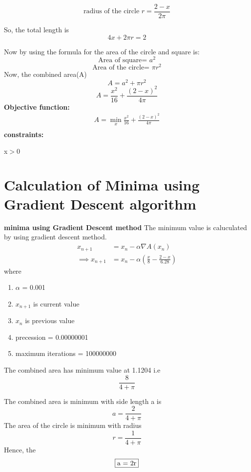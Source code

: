 \documentclass[10pt, a4paper]{article}
\providecommand{\brak}[1]{\ensuremath{\left(#1\right)}}
\begin{document}
\begin{equation}
\text{radius  of the circle }
r=\frac{2-x}{2\pi}
\label{eq-2}
\end{equation}


So, the total length is 
\begin{equation}
4x + 2\pi r = 2
\end{equation} 

Now by using the formula for the area of the circle and square is:
\begin{equation}
\text{Area of square= }a^2
\end{equation}
\begin{equation}
\text{Area of the circle= }\pi r^2
\end{equation}
Now, the combined area(A) 
\begin{equation}
A=a^2+\pi r^2
\end{equation}
\begin{equation}
A = \frac{x^2}{16} + \frac{(2-x)^2}{4\pi}
\end{equation}
\textbf{Objective function:}
\begin{align}
A= \min_x\frac{x^2}{16} + \frac{(2-x)^2}{4\pi}\\
\end{align}
\textbf{constraints:}\\
\begin{center}
x$>$0\\
\end{center}



\section{Calculation of Minima using Gradient Descent algorithm}
\textbf{minima using  Gradient Descent  method}
The minimum value is caluculated by using gradient descent method.
\begin{align}
        x_{n+1} &= x_n - \alpha \nabla A(x_n) \\
        \implies x_{n+1} &= x_n - \alpha\brak{\frac{x}{8}-\frac{2-x}{6.28}}
\end{align}
where \\
\begin{enumerate}
\item $\alpha$ = 0.001
\item $x_{n+1}$ is current value
\item $x_{n}$ is previous value
\item precession = 0.00000001
\item maximum iterations = 100000000
\end{enumerate}
The combined area has minimum value at 1.1204 i.e
\begin{equation}
\frac{8}{4+\pi}
\end{equation}

The  combined area is minimum with side length a is 
\begin{equation}
a =\frac{2}{4+\pi}
\end{equation}
The area of the circle is minimum with radius 
\begin{equation}
r =\frac{1}{4+\pi}
\end{equation}
Hence, the 
\begin{equation}
\boxed{$a = 2r$}
\end{equation}
\end{document}
